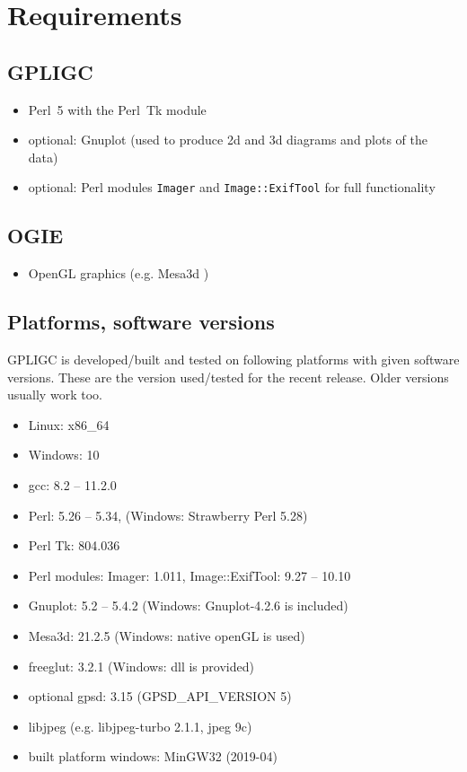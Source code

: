 \section{Requirements}
\label{requirements}

\subsection*{GPLIGC}

\begin{itemize}
\item Perl~5 with the Perl~Tk module \cite{perl,perltk}
\item {\scriptsize optional:} Gnuplot \cite{gnuplot} (used to produce 2d and 3d diagrams and plots of the data)
\item {\scriptsize optional:} Perl modules \texttt{Imager} \cite{imager} and \texttt{Image::ExifTool} \cite{exiftool} for full functionality
\end{itemize}


\subsection*{OGIE}

\begin{itemize}
\item OpenGL graphics (e.g. Mesa3d \cite{mesa})
\end{itemize}


\subsection*{Platforms, software versions}
GPLIGC is developed/built and tested on following platforms with given software versions.
These are the version used/tested for the recent release. Older versions usually work too.

\begin{itemize}
\item Linux: x86\_64
\item Windows: 10
\item gcc: 8.2 -- 11.2.0 %
\item Perl: 5.26 -- 5.34, %
(Windows: Strawberry Perl 5.28)
\item Perl Tk: 804.036
\item Perl modules: Imager: 1.011, %
Image::ExifTool: 9.27 -- 10.10
\item Gnuplot: 5.2 -- 5.4.2 (Windows: Gnuplot-4.2.6 is included)
\item Mesa3d: 21.2.5 (Windows: native openGL is used)
\item freeglut: 3.2.1 (Windows: dll is provided)
\item {\scriptsize optional} gpsd: 3.15 (GPSD\_API\_VERSION 5)
\item libjpeg (e.g. libjpeg-turbo 2.1.1, jpeg 9c)
\item built platform windows: MinGW32 (2019-04)
\end{itemize}
